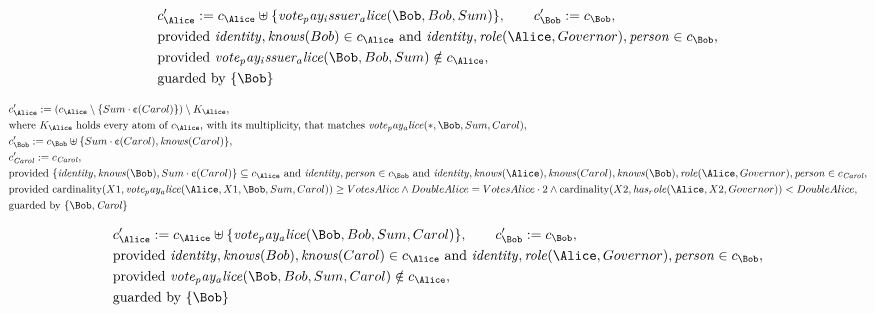\begin{align*}
&
c'_
{
\Alice
}
 := 
c_
{
\Alice
}
 \uplus 
\{
\mathit{
vote_pay_issuer_alice
}
(
\Bob
,
Bob
,
Sum
)
\}
, \qquad 
c'_
{
\Bob
}
 := 
c_
{
\Bob
}
,\\
&
\text{provided } 
\mathit{
identity
}
,
\mathit{
knows
}
(
Bob
)
 \in c_
{
\Alice
}
 \text{ and } 
\mathit{
identity
}
,
\mathit{
role
}
(
\Alice
,
Governor
)
,
\mathit{
person
}
 \in c_
{
\Bob
}
,\\
&
\text{provided } 
\mathit{
vote_pay_issuer_alice
}
(
\Bob
,
Bob
,
Sum
)
 \notin c_
{
\Alice
}
,\\
&
\text{guarded by } \{
\Bob
\}
\end{align*}

\begin{align*}
&
c'_
{
\Alice
}
 := 
(c_
{
\Alice
}
 \setminus 
\{
Sum
\cdot
\text{\textcent}
(
Carol
)
\}
) \setminus K_
{
\Alice
}
,\\
&
\text{where } K_
{
\Alice
}
 \text{ holds every atom of } c_
{
\Alice
}
 \text{, with its multiplicity, that matches } 
\mathit{
vote_pay_alice
}
(
\ast
,
\Bob
,
Sum
,
Carol
)
,\\
&
c'_
{
\Bob
}
 := 
c_
{
\Bob
}
 \uplus 
\{
Sum
\cdot
\text{\textcent}
(
Carol
)
,
\mathit{
knows
}
(
Carol
)
\}
,\\
&
c'_
{
\mathit{Carol}
}
 := 
c_
{
\mathit{Carol}
}
,\\
&
\text{provided } 
\{
\mathit{
identity
}
,
\mathit{
knows
}
(
\Bob
)
,
Sum
\cdot
\text{\textcent}
(
Carol
)
\}
 \subseteq c_
{
\Alice
}
 \text{ and } 
\mathit{
identity
}
,
\mathit{
person
}
 \in c_
{
\Bob
}
 \text{ and } 
\mathit{
identity
}
,
\mathit{
knows
}
(
\Alice
)
,
\mathit{
knows
}
(
Carol
)
,
\mathit{
knows
}
(
\Bob
)
,
\mathit{
role
}
(
\Alice
,
Governor
)
,
\mathit{
person
}
 \in c_
{
\mathit{Carol}
}
,\\
&
\text{provided } 
\mathrm{cardinality}(
X1
,
\mathit{
vote_pay_alice
}
(
\Alice
,
X1
,
\Bob
,
Sum
,
Carol
)
)
\ge
VotesAlice
\land
DoubleAlice
=
VotesAlice
\cdot
2
\land
\mathrm{cardinality}(
X2
,
\mathit{
has_role
}
(
\Alice
,
X2
,
Governor
)
)
<
DoubleAlice
,\\
&
\text{guarded by } \{
\Bob
,
\mathit{Carol}
\}
\end{align*}

\begin{align*}
&
c'_
{
\Alice
}
 := 
c_
{
\Alice
}
 \uplus 
\{
\mathit{
vote_pay_alice
}
(
\Bob
,
Bob
,
Sum
,
Carol
)
\}
, \qquad 
c'_
{
\Bob
}
 := 
c_
{
\Bob
}
,\\
&
\text{provided } 
\mathit{
identity
}
,
\mathit{
knows
}
(
Bob
)
,
\mathit{
knows
}
(
Carol
)
 \in c_
{
\Alice
}
 \text{ and } 
\mathit{
identity
}
,
\mathit{
role
}
(
\Alice
,
Governor
)
,
\mathit{
person
}
 \in c_
{
\Bob
}
,\\
&
\text{provided } 
\mathit{
vote_pay_alice
}
(
\Bob
,
Bob
,
Sum
,
Carol
)
 \notin c_
{
\Alice
}
,\\
&
\text{guarded by } \{
\Bob
\}
\end{align*}

